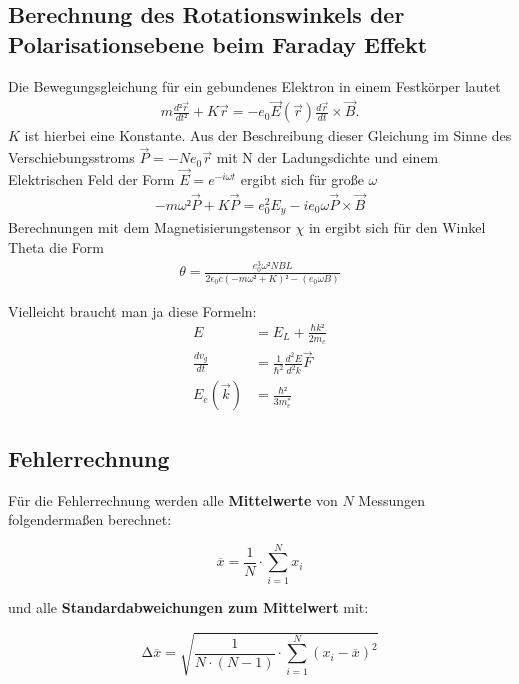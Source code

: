 \subsection{Berechnung des Rotationswinkels der Polarisationsebene beim Faraday Effekt \cite{man_a} }
Die Bewegungsgleichung für ein gebundenes Elektron in einem Festkörper lautet
\begin{align}
	m \frac{d² \vec{r}}{d t²} + K \vec{r} = -e_0 \vec{E}(\vec{r}) \frac{d \vec{r}}{dt} \times \vec{B}.
\end{align}
$K$ ist hierbei eine Konstante.
Aus der Beschreibung dieser Gleichung im Sinne des Verschiebungsstroms $\vec{P} = -N e_0 \vec{r}$
mit N der Ladungsdichte
und einem Elektrischen Feld der Form $\vec{E} = e^{- i \omega t}$ ergibt sich für große $\omega$
\begin{align}
	-m\omega² \vec{P} + K \vec{P} = e_0^2 E_y -i e_0 \omega \vec{P} \times \vec{B}
\end{align}
Berechnungen mit dem Magnetisierungstensor $\chi$ in \cite{man_a} ergibt sich für den Winkel Theta
die Form
\begin{align} %
	\theta = \frac{e_0^3 \omega² NBL}{2 \epsilon_0 c(-m\omega²+ K)² -(e_0 \omega B)}
\end{align}

Vielleicht braucht man ja diese Formeln:
\begin{align}
	E                 & = E_L + \frac{\hbar k²}{2 m_e}                 \\
	\frac{d v_g}{d t} & = \frac{1}{\hbar^2}\frac{d^2 E}{d^2 k} \vec{F} \\
	E_e(\vec{k})      & = \frac{\hbar²}{3m^*_e}
\end{align}

\subsection{Fehlerrechnung}
Für die Fehlerrechnung werden alle \textbf{Mittelwerte} von $N$ Messungen
folgendermaßen berechnet:

\begin{equation}
	\overline{x} = \frac{1}{N} \cdot \sum_{i=1}^N x_i
	\label{eqn:Mittelwert}
\end{equation}

und alle \textbf{Standardabweichungen zum Mittelwert} mit:

\begin{equation}
	\increment\overline{x} = \sqrt{\frac{1}{N\cdot(N-1)}\cdot\sum_{i=1}^N (x_i-\overline{x})^2}
	\label{eqn:St_Mittelwert}
\end{equation}

